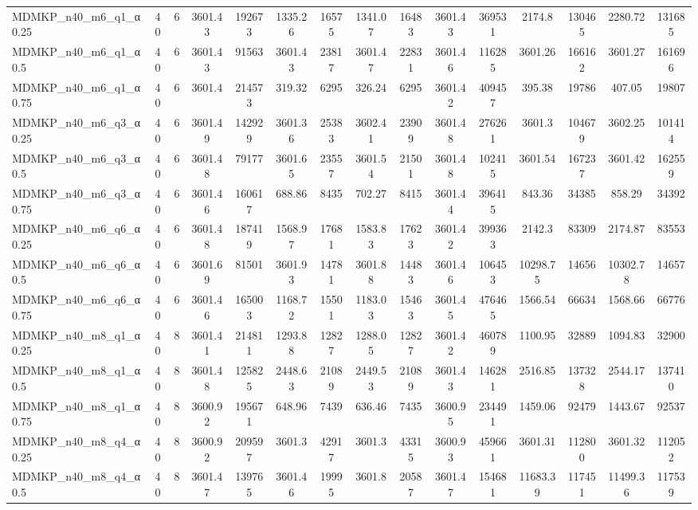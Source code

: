\begin{table}[!ht]
{\begin{tabular}{lcccccccccccccc}
MDMKP\_n40\_m6\_q1\_α0.25 & 40 & 6 & 3601.43 & 192673 & 1335.26 & 16575 & 1341.07 & 16483 & 3601.43 & 369531 & 2174.8 & 130465 & 2280.72 & 131685 \\
MDMKP\_n40\_m6\_q1\_α0.5 & 40 & 6 & 3601.43 & 91563 & 3601.43 & 23817 & 3601.47 & 22831 & 3601.46 & 116285 & 3601.26 & 166162 & 3601.27 & 161696 \\
MDMKP\_n40\_m6\_q1\_α0.75 & 40 & 6 & 3601.4 & 214573 & 319.32 & 6295 & 326.24 & 6295 & 3601.42 & 409457 & 395.38 & 19786 & 407.05 & 19807 \\
MDMKP\_n40\_m6\_q3\_α0.25 & 40 & 6 & 3601.49 & 142929 & 3601.36 & 25383 & 3602.41 & 23909 & 3601.48 & 276261 & 3601.3 & 104679 & 3602.25 & 101414 \\
MDMKP\_n40\_m6\_q3\_α0.5 & 40 & 6 & 3601.48 & 79177 & 3601.65 & 23557 & 3601.54 & 21501 & 3601.48 & 102415 & 3601.54 & 167237 & 3601.42 & 162559 \\
MDMKP\_n40\_m6\_q3\_α0.75 & 40 & 6 & 3601.46 & 160617 & 688.86 & 8435 & 702.27 & 8415 & 3601.44 & 396415 & 843.36 & 34385 & 858.29 & 34392 \\
MDMKP\_n40\_m6\_q6\_α0.25 & 40 & 6 & 3601.48 & 187419 & 1568.97 & 17681 & 1583.83 & 17623 & 3601.42 & 399363 & 2142.3 & 83309 & 2174.87 & 83553 \\
MDMKP\_n40\_m6\_q6\_α0.5 & 40 & 6 & 3601.69 & 81501 & 3601.93 & 14781 & 3601.88 & 14483 & 3601.46 & 106453 & 10298.75 & 14656 & 10302.78 & 14657 \\
MDMKP\_n40\_m6\_q6\_α0.75 & 40 & 6 & 3601.46 & 165003 & 1168.72 & 15501 & 1183.03 & 15463 & 3601.45 & 476465 & 1566.54 & 66634 & 1568.66 & 66776 \\
MDMKP\_n40\_m8\_q1\_α0.25 & 40 & 8 & 3601.41 & 214811 & 1293.88 & 12827 & 1288.05 & 12827 & 3601.42 & 460789 & 1100.95 & 32889 & 1094.83 & 32900 \\
MDMKP\_n40\_m8\_q1\_α0.5 & 40 & 8 & 3601.48 & 125825 & 2448.63 & 21089 & 2449.53 & 21089 & 3601.43 & 146281 & 2516.85 & 137328 & 2544.17 & 137410 \\
MDMKP\_n40\_m8\_q1\_α0.75 & 40 & 8 & 3600.92 & 195671 & 648.96 & 7439 & 636.46 & 7435 & 3600.95 & 234491 & 1459.06 & 92479 & 1443.67 & 92537 \\
MDMKP\_n40\_m8\_q4\_α0.25 & 40 & 8 & 3600.92 & 209597 & 3601.3 & 42917 & 3601.3 & 43315 & 3600.93 & 459661 & 3601.31 & 112800 & 3601.32 & 112052 \\
MDMKP\_n40\_m8\_q4\_α0.5 & 40 & 8 & 3601.47 & 139765 & 3601.46 & 19995 & 3601.8 & 20587 & 3601.47 & 154681 & 11683.39 & 117451 & 11499.36 & 117539 \\

\end{tabular}}
\end{table}
